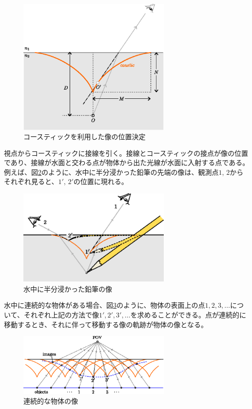 \documentclass[twocolumn]{article}
\begin{document}
	\begin{figure}[ht]
		\centering
		\includegraphics[width=3in]{figs/g394.eps}
		\caption{コースティックを利用した像の位置決定}
		\label{fig:image_caustic}
	\end{figure}
	
	視点からコースティックに接線を引く。接線とコースティックの接点が像の位置であり、接線が水面と交わる点が物体から出た光線が水面に入射する点である。
	例えば、図\ref{fig:pencil_view}のように、水中に半分浸かった鉛筆の先端の像は、観測点$1$, $2$からそれぞれ見ると、$1'$, $2'$の位置に現れる。
	
	\begin{figure}[ht]
		\centering
		\includegraphics[width=3in]{figs/g43.eps}
		\caption{水中に半分浸かった鉛筆の像}
		\label{fig:pencil_view}
	\end{figure}
	
	水中に連続的な物体がある場合、図\ref{fig:extended_image}のように、物体の表面上の点$1, 2, 3, \dots$について、それぞれ上記の方法で像$1', 2', 3', \dots$を求めることができる。点が連続的に移動するとき、それに伴って移動する像の軌跡が物体の像となる。
	
	\begin{figure}[ht]
		\centering
		\includegraphics*[width=3in]{figs/g240.eps}
		\caption{連続的な物体の像}
		\label{fig:extended_image}
	\end{figure}
	
\end{document}
